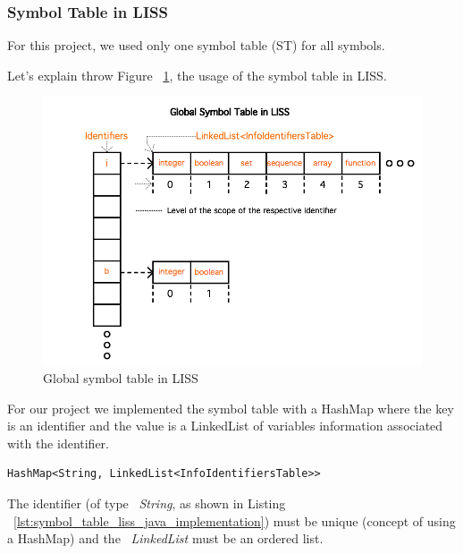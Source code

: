 \documentclass[
  oneside,
  11pt, a4paper,
  footinclude=true,
  headinclude=true,
  cleardoublepage=empty
]{scrbook}
\begin{document}

\newpage

\subsubsection{Symbol Table in LISS}

For this project, we used only one symbol table (ST) for all symbols.

Let's explain throw Figure ~\ref{fig:global_symbol_table_liss}, the usage of the symbol table in LISS.

\begin{figure}[h!]
  \centering
    \includegraphics[width=1\textwidth]{img/global_symbol_table.png}
    \caption{Global symbol table in LISS}
    \label{fig:global_symbol_table_liss}
\end{figure}

For our project we implemented the symbol table with a HashMap where the key is an identifier and the value is a LinkedList of variables information associated with the identifier.

\begin{lstlisting}[caption={Data structure of the symbol table in LISS},label={lst:symbol_table_liss_java_implementation}]
	HashMap<String, LinkedList<InfoIdentifiersTable>>
\end{lstlisting}

The identifier (of type ~\textit{String}, as shown in Listing ~\ref{lst:symbol_table_liss_java_implementation}) must be unique (concept of using a HashMap) and the ~\textit{LinkedList} must be an ordered list.
\end{document}
